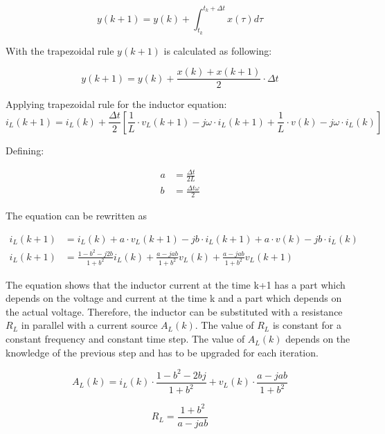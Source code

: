 \begin{equation}
	y(k+1) = y(k) + \int_{t_k}^{t_k+ \Delta t} x(\tau)d \tau
\end{equation}

With the trapezoidal rule $y(k+1)$ is calculated as following:

\begin{equation}
	y(k+1)=y(k)+ \frac{x(k)+x(k+1)}{2} \cdot \Delta t
\end{equation}

Applying trapezoidal rule for the inductor equation:
\begin{equation}
        i_L(k+1) = i_L(k) + \frac{\Delta t}{2} \left[ \frac{1}{L} \cdot v_L(k+1) - j \omega \cdot i_L(k+1) + \frac{1}{L} \cdot v(k) - j \omega \cdot i_L(k) \right]
\end{equation}

Defining:

\begin{align}
	a &= \frac{\Delta t}{2L} \\
	b &= \frac{\Delta t \omega}{2}
\end{align}
		
The equation can be rewritten as

\begin{align}
        i_L(k+1) &= i_L(k) + a \cdot v_L(k+1) - j b \cdot i_L(k+1) + a \cdot v(k) - j b \cdot i_L(k) \\
        i_L(k+1) &= \frac{1-b^2-j2b}{1+b^2}i_L(k) + \frac{a-jab}{1+b^2} v_L(k) + \frac{a-jab}{1+b^2} v_L(k+1)
\end{align}

The equation shows that the inductor current at the time k+1 has a part which depends on the voltage and current at the time k and a part which depends on the actual voltage. Therefore, the inductor can be substituted with a resistance $R_L$ in parallel with a current source $A_L(k)$. The value of $R_L$ is constant for a constant frequency and constant time step. The value of $A_L(k)$ depends on the knowledge of the previous step and has to be upgraded for each iteration.
 
\begin{equation}
	A_L(k) = i_L(k) \cdot \frac{1-b^2-2bj}{1+b^2} + v_L(k) \cdot \frac{a-jab}{1+b^2}
\end{equation}

\begin{equation}
	R_L = \frac{1+b^2}{a-jab}
\end{equation}	

